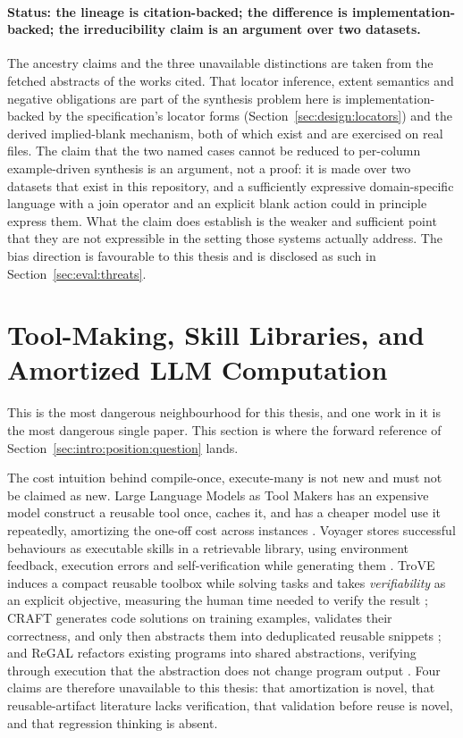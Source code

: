\paragraph{Status: the lineage is citation-backed; the difference is
implementation-backed; the irreducibility claim is an argument over two datasets.}
The ancestry claims and the three unavailable distinctions are taken from the fetched abstracts
of the works cited. That locator inference, extent semantics and negative obligations are part
of the synthesis problem here is implementation-backed by the specification's locator forms
(Section~\ref{sec:design:locators}) and the derived implied-blank mechanism, both of which
exist and are exercised on real files. The claim that the two named cases cannot be reduced to
per-column example-driven synthesis is an argument, not a proof: it is made over two datasets
that exist in this repository, and a sufficiently expressive domain-specific language with a
join operator and an explicit blank action could in principle express them. What the claim does
establish is the weaker and sufficient point that they are not expressible in the setting those
systems actually address. The bias direction is favourable to this thesis and is disclosed as
such in Section~\ref{sec:eval:threats}.

\section{Tool-Making, Skill Libraries, and Amortized LLM Computation}
\label{sec:rel:toolmaking}

This is the most dangerous neighbourhood for this thesis, and one work in it is the most
dangerous single paper. This section is where the forward reference of
Section~\ref{sec:intro:position:question} lands.

The cost intuition behind compile-once, execute-many is not new and must not be claimed as
new. Large Language Models as Tool Makers has an expensive model construct a reusable tool once,
caches it, and has a cheaper model use it repeatedly, amortizing the one-off cost across
instances \cite{cai2024latm}. Voyager stores successful behaviours as executable skills in a
retrievable library, using environment feedback, execution errors and self-verification while
generating them \cite{wang2024voyager}. TroVE induces a compact reusable toolbox while solving
tasks and takes \emph{verifiability} as an explicit objective, measuring the human time needed
to verify the result \cite{wang2024trove}; CRAFT generates code solutions on training examples,
validates their correctness, and only then abstracts them into deduplicated reusable snippets
\cite{yuan2024craft}; and ReGAL refactors existing programs into shared abstractions, verifying
through execution that the abstraction does not change program output
\cite{stengeleskin2024regal}. Four claims are therefore unavailable to this thesis: that
amortization is novel, that reusable-artifact literature lacks verification, that validation
before reuse is novel, and that regression thinking is absent.

